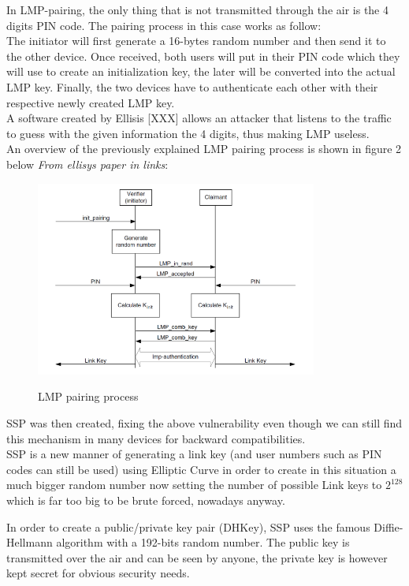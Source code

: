 In LMP-pairing, the only thing that is not transmitted through the air is the 4 digits PIN code. The pairing process in this case works as follow: \\
The initiator will first generate a 16-bytes random number and then send it to the other device. Once received, both users will put in their PIN code which they will use to create an initialization key, the later will be converted into the actual LMP key. Finally, the two devices have to authenticate each other with their respective newly created LMP key. \\
A software created by Ellisis [XXX] allows an attacker that listens to the traffic to guess with the given information the 4 digits, thus making LMP useless. \\
An overview of the previously explained LMP pairing process is shown in figure 2 below \textit{From ellisys paper in links}: 
\begin{figure}[!h]
  \begin{center}
	\includegraphics[width=350px]{images/haha.png}
	\label{LMP pairing}
	\caption{LMP pairing process}
  \end{center}
\end{figure}


SSP was then created, fixing the above vulnerability even though we can still find this mechanism in many devices for backward compatibilities. \\
SSP is a new manner of generating a link key (and user numbers such as PIN codes can still be used) using Elliptic Curve in order to create in this situation a much bigger random number now setting the number of possible Link keys to \(2^{128}\) which is far too big to be brute forced, nowadays anyway. 

In order to create a public/private key pair (DHKey), SSP uses the famous Diffie-Hellmann algorithm with a 192-bits random number. The public key is transmitted over the air and can be seen by anyone, the private key is however kept secret for obvious security needs. 

